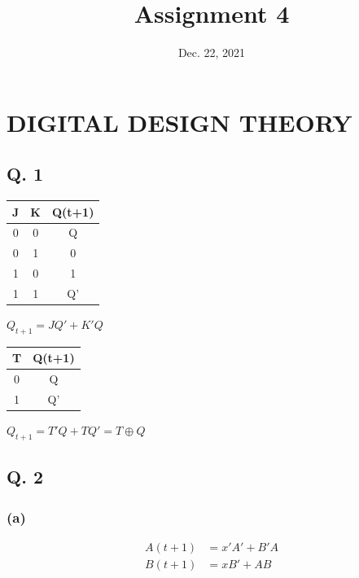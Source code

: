 \documentclass[onecolumn, oneside, ctexart]{SUSTechHomework}
\title{Assignment 4}
\date{Dec. 22, 2021}
\begin{document}
  \maketitle
\section{DIGITAL DESIGN THEORY}

\subsection*{Q. 1}
\vspace{-2em}
\begin{longtable}[c]{cc|c}
\hline
J & K & Q(t+1) \\ \hline
\endfirsthead
%
\endhead
%
\hline
\endfoot
%
\endlastfoot
%
0 & 0 & Q      \\
0 & 1 & 0      \\
1 & 0 & 1      \\
1 & 1 & Q'     \\ \hline
\end{longtable}
\vspace{-1em}
\centerline{$Q_{t+1}=JQ'+K'Q$}
\vspace{1em}
\begin{longtable}[c]{c|c}
\hline
T & Q(t+1) \\ \hline
\endfirsthead
%
\endhead
%
0 & Q      \\
1 & Q'     \\ \hline 
\end{longtable}
\vspace{-1em}
\centerline{$Q_{t+1}=T'Q+TQ'=T\oplus Q$}

\subsection*{Q. 2}
\subsubsection*{(a)}
\vspace{-5em}
\begin{align*}
A(t+1)&=x'A'+B'A\\
B(t+1)&=xB'+AB
\end{align*}
\vspace{-4em}
\end{document}
